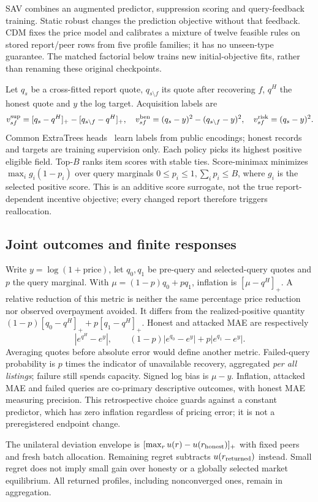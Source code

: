 \documentclass[11pt]{article}
\begin{document}
SAV combines an augmented predictor, suppression scoring and query-feedback
training. Static robust changes the prediction objective without that feedback.
CDM fixes the price model and calibrates a mixture of twelve feasible rules
on stored report/peer rows from five profile families; it has no unseen-type
guarantee. The matched factorial below trains new initial-objective fits,
rather than renaming these original checkpoints.

Let $q_s$ be a cross-fitted report quote, $q_{s\setminus f}$ its quote after
recovering $f$, $q^H$ the honest quote and $y$ the log target. Acquisition labels are
\[
 v^{\rm sup}_{sf}=[q_s-q^H]_+-[q_{s\setminus f}-q^H]_+,\quad
 v^{\rm ben}_{sf}=(q_s-y)^2-(q_{s\setminus f}-y)^2,\quad
 v^{\rm risk}_{sf}=(q_s-y)^2.
\]
Common ExtraTrees heads~\cite{extratrees} learn labels from public encodings;
honest records and targets are training supervision only. Each policy picks
its highest positive eligible field. Top-$B$ ranks item scores with stable
ties. Score-minimax minimizes $\max_i g_i(1-p_i)$ over query marginals
$0\le p_i\le1,\sum_i p_i\le B$, where $g_i$ is the selected positive score.
This is an additive score surrogate, not the true report-dependent incentive
objective; every changed report therefore triggers reallocation.

\subsection{Joint outcomes and finite responses}
Write $y=\log(1+\mathrm{price})$, let $q_0,q_1$ be pre-query and selected-query
quotes and $p$ the query marginal. With $\mu=(1-p)q_0+pq_1$, inflation is
$[\mu-q^H]_+$. A relative reduction of this metric is neither the same percentage price reduction nor observed overpayment avoided. It differs from the realized-positive quantity
$(1-p)[q_0-q^H]_++p[q_1-q^H]_+$. Honest and attacked MAE are respectively
\[
 |e^{q^H}-e^y|,\qquad (1-p)|e^{q_0}-e^y|+p|e^{q_1}-e^y|.
\]
Averaging quotes before absolute error would define another metric. Failed-query
probability is $p$ times the indicator of unavailable recovery, aggregated
\emph{per all listings}; failure still spends capacity. Signed log bias is
$\mu-y$. Inflation, attacked MAE and failed queries are co-primary descriptive
outcomes, with honest MAE measuring precision. This retrospective choice guards
against a constant predictor, which has zero inflation regardless of pricing
error; it is not a preregistered endpoint change.

The unilateral deviation envelope is
$[\max_r u(r)-u(r_{\rm honest})]_+$ with fixed peers and fresh batch allocation.
Remaining regret subtracts $u(r_{\rm returned})$ instead. Small regret does
not imply small gain over honesty or a globally selected market equilibrium.
All returned profiles, including nonconverged ones, remain in aggregation.
\end{document}

